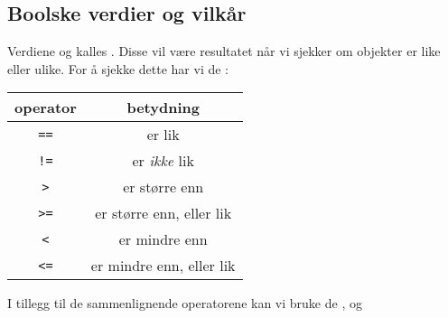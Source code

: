 
\subsection{Boolske verdier og vilkår}
Verdiene  og  kalles . Disse vil være resultatet når vi sjekker om objekter er like eller ulike. For å sjekke dette har vi de :
\begin{center}
	\begin{tabular}{c|c}
		\textbf{operator} & \textbf{betydning} \\ \hline
		\texttt{==}	& er lik \\ \rowcolor{gray!10}
		\texttt{!=} & er \textsl{ikke} lik\\
		\texttt{>} & er større enn \\ \rowcolor{gray!10}
		\texttt{>=} & er større enn, eller lik \\
		\texttt{<} & er mindre enn \\ \rowcolor{gray!10}
		\texttt{<=} & er mindre enn, eller lik \\		
	\end{tabular}
\end{center}
\vsk

I tillegg til de sammenlignende operatorene kan vi bruke de  ,  og 
